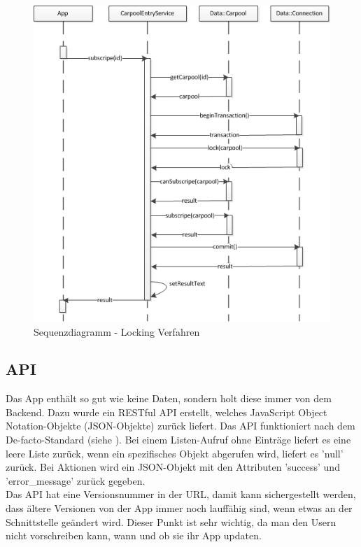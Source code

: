 \begin{figure}[h]
\centering
\includegraphics[scale=0.5]{images/visio/locking_verfahren.png}
\caption{Sequenzdiagramm - Locking Verfahren}
\label{fig:locking_verfahren}
\end{figure}

\FloatBarrier
\subsection{API}
Das App enthält so gut wie keine Daten, sondern holt diese immer von dem Backend. Dazu wurde ein RESTful API erstellt, welches JavaScript Object Notation-Objekte (JSON-Objekte) zurück liefert. Das API funktioniert nach dem De-facto-Standard (siehe \cite{wiki_restful}). Bei einem Listen-Aufruf ohne Einträge liefert es eine leere Liste zurück, wenn ein spezifisches Objekt abgerufen wird, liefert es 'null' zurück. Bei Aktionen wird ein JSON-Objekt mit den Attributen 'success' und 'error\_message' zurück gegeben.\\

Das API hat eine Versionsnummer in der URL, damit kann sichergestellt werden, dass ältere Versionen von der App immer noch lauffähig sind, wenn etwas an der Schnittstelle geändert wird. Dieser Punkt ist sehr wichtig, da man den Usern nicht vorschreiben kann, wann und ob sie ihr App updaten.

